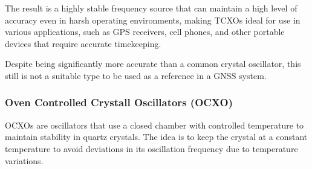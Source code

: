 The result is a highly stable frequency source that can maintain a high level of accuracy even in harsh operating environments, making TCXOs ideal for use in various applications, such as GPS receivers, cell phones, and other portable devices that require accurate timekeeping.

Despite being significantly more accurate than a common crystal oscillator, this still is not a suitable type to be used as a reference in a GNSS system.

\subsubsection{Oven Controlled Crystall Oscillators (OCXO)}




OCXOs are oscillators that use a closed chamber with controlled temperature to maintain stability in quartz crystals. The idea is to keep the crystal at a constant temperature to avoid deviations in its oscillation frequency due to temperature variations.

